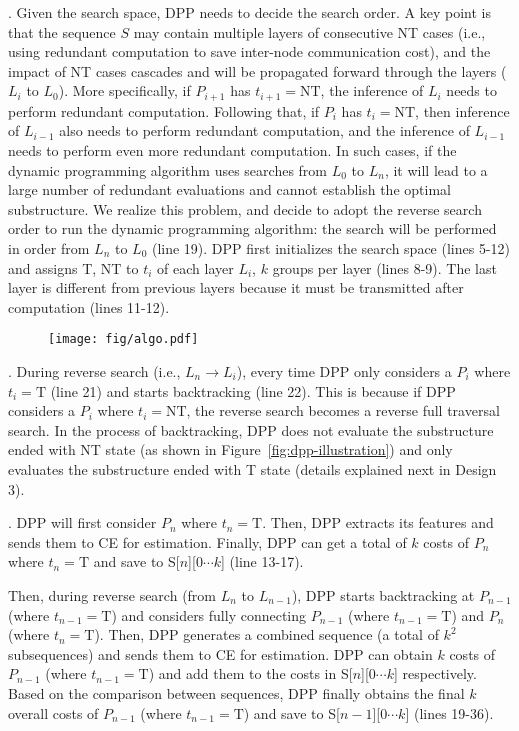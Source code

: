 . Given the search space, DPP needs to decide the search order. A key point is that the sequence $S$ may contain multiple layers of consecutive NT cases (i.e., using redundant computation to save inter-node communication cost), and the impact of NT cases cascades and will be propagated forward through the layers ($L_i$ to $L_0$).
More specifically, if $P_{i+1}$ has $t_{i+1}=\text{NT}$, the inference of $L_i$ needs to perform redundant computation. Following that, if $P_i$ has $t_i=\text{NT}$, then inference of $L_{i-1}$ also needs to perform redundant computation, and the inference of $L_{i-1}$ needs to perform even more redundant computation.
In such cases, if the dynamic programming algorithm uses searches from $L_0$ to $L_n$, it will lead to a large number of redundant evaluations and cannot establish the optimal substructure. We realize this problem, and decide to adopt the reverse search order to run the dynamic programming algorithm: the search will be performed in order from $L_n$ to $L_0$ (line 19).  DPP first initializes the search space (lines 5-12) and assigns {T, NT} to $t_i$ of each layer $L_i$, $k$ groups per layer (lines 8-9). The last layer is different from previous layers because it must be transmitted after computation (lines 11-12). 

\begin{figure}[t]
	\centering
	\texttt{[image: fig/algo.pdf]}
	\label{algo:DPP-algo}
\end{figure}

. During reverse search (i.e., $L_{n}\rightarrow L_{i}$), every time DPP only considers a $P_i$ where $t_i=\text{T}$ (line 21) and starts backtracking (line 22). This is because if DPP considers a $P_i$ where $t_i=\text{NT}$, the reverse search becomes a reverse full traversal search. In the process of backtracking, DPP does not evaluate the substructure ended with NT state (as shown in Figure~\ref{fig:dpp-illustration}) and only evaluates the substructure ended with T state (details explained next in Design 3).


. DPP will first consider $P_n$ where $t_n=\text{T}$. Then, DPP extracts its features and sends them to CE for estimation. Finally, DPP can get a total of $k$ costs of $P_n$ where $t_n=\text{T}$ and save to S[$n$][$0\cdots k$] (line 13-17). 

Then, during reverse search (from $L_n$ to $L_{n-1}$), DPP starts backtracking at $P_{n-1}$ (where $t_{n-1}=\text{T}$) and considers fully connecting $P_{n-1}$ (where $t_{n-1}=\text{T}$) and $P_n$ (where $t_n=\text{T}$). Then, DPP generates a combined sequence (a total of $k^2$ subsequences) and sends them to CE for estimation. DPP can obtain $k$ costs of $P_{n-1}$ (where $t_{n-1}=\text{T}$) and add them to the costs in S[$n$][$0\cdots k$] respectively. Based on the comparison between sequences, DPP finally obtains the final $k$ overall costs of $P_{n-1}$ (where $t_{n-1}=\text{T}$) and save to S[$n-1$][$0\cdots k$] (lines 19-36).

